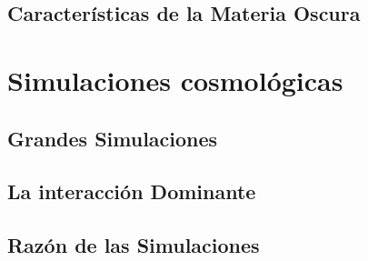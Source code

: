 \documentclass{beamer}
\begin{document}
\subsection{Características de la Materia Oscura}
	\begin{frame}



	\end{frame}


\section{Simulaciones cosmológicas}
	\begin{frame}



	\end{frame}
\subsection{Grandes Simulaciones}
	\begin{frame}



	\end{frame}
\subsection[La interacción dominante en las simulaciones]{La interacción Dominante}
	\begin{frame}



	\end{frame}
\subsection[Una razón práctica para las simulaciones]{Razón de las Simulaciones}
	\begin{frame}



	\end{frame}
\end{document}
